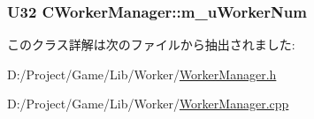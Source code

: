 \subsubsection[{m\+\_\+u\+Worker\+Num}]{\setlength{\rightskip}{0pt plus 5cm}U32 C\+Worker\+Manager\+::m\+\_\+u\+Worker\+Num\hspace{0.3cm}{\ttfamily [private]}}\label{class_c_worker_manager_a06bca404c8d4d519fd676e9dd7470fe7}


このクラス詳解は次のファイルから抽出されました\+:\begin{DoxyCompactItemize}
\item 
D\+:/\+Project/\+Game/\+Lib/\+Worker/\hyperlink{_worker_manager_8h}{Worker\+Manager.\+h}\item 
D\+:/\+Project/\+Game/\+Lib/\+Worker/\hyperlink{_worker_manager_8cpp}{Worker\+Manager.\+cpp}\end{DoxyCompactItemize}
